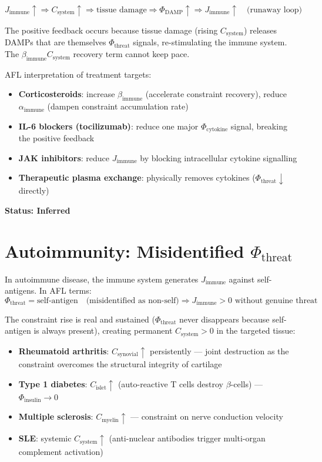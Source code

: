 \documentclass[12pt,a4paper]{article}
\begin{document}
\begin{equation}
    J_{\mathrm{immune}} \uparrow \Rightarrow C_{\mathrm{system}} \uparrow \Rightarrow \text{tissue damage} \Rightarrow \Phi_{\mathrm{DAMP}} \uparrow \Rightarrow J_{\mathrm{immune}} \uparrow \quad \text{(runaway loop)}
\end{equation}

The positive feedback occurs because tissue damage (rising $C_{\mathrm{system}}$) releases DAMPs that are themselves $\Phi_{\mathrm{threat}}$ signals, re-stimulating the immune system. The $\beta_{\mathrm{immune}} C_{\mathrm{system}}$ recovery term cannot keep pace.

AFL interpretation of treatment targets:
\begin{itemize}
    \item \textbf{Corticosteroids}: increase $\beta_{\mathrm{immune}}$ (accelerate constraint recovery), reduce $\alpha_{\mathrm{immune}}$ (dampen constraint accumulation rate)
    \item \textbf{IL-6 blockers (tocilizumab)}: reduce one major $\Phi_{\mathrm{cytokine}}$ signal, breaking the positive feedback
    \item \textbf{JAK inhibitors}: reduce $J_{\mathrm{immune}}$ by blocking intracellular cytokine signalling
    \item \textbf{Therapeutic plasma exchange}: physically removes cytokines ($\Phi_{\mathrm{threat}} \downarrow$ directly)
\end{itemize}

\textbf{Status: Inferred}

\section{Autoimmunity: Misidentified $\Phi_{\mathrm{threat}}$}

In autoimmune disease, the immune system generates $J_{\mathrm{immune}}$ against self-antigens. In AFL terms:
\begin{equation}
    \Phi_{\mathrm{threat}} = \text{self-antigen} \quad \text{(misidentified as non-self)} \Rightarrow J_{\mathrm{immune}} > 0 \text{ without genuine threat}
\end{equation}

The constraint rise is real and sustained ($\Phi_{\mathrm{threat}}$ never disappears because self-antigen is always present), creating permanent $C_{\mathrm{system}} > 0$ in the targeted tissue:
\begin{itemize}
    \item \textbf{Rheumatoid arthritis}: $C_{\mathrm{synovial}} \uparrow$ persistently --- joint destruction as the constraint overcomes the structural integrity of cartilage
    \item \textbf{Type 1 diabetes}: $C_{\mathrm{islet}} \uparrow$ (auto-reactive T cells destroy $\beta$-cells) --- $\Phi_{\mathrm{insulin}} \to 0$
    \item \textbf{Multiple sclerosis}: $C_{\mathrm{myelin}} \uparrow$ --- constraint on nerve conduction velocity
    \item \textbf{SLE}: systemic $C_{\mathrm{system}} \uparrow$ (anti-nuclear antibodies trigger multi-organ complement activation)
\end{itemize}
\end{document}
